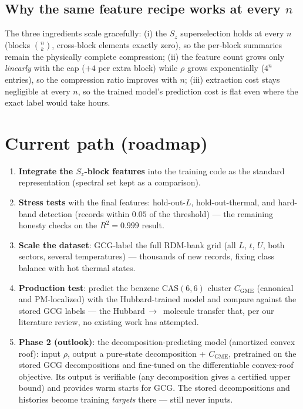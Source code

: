 \documentclass[11pt]{article}
\newcommand{\CGME}{\ensuremath{C_{\mathrm{GME}}}}
\begin{document}
\subsection{Why the same feature recipe works at every $n$}
The three ingredients scale gracefully: (i) the $S_z$ superselection holds at
every $n$ (blocks $\binom{n}{k}$, cross-block elements exactly zero), so the
per-block summaries remain the physically complete compression; (ii) the
feature count grows only \emph{linearly} with the cap ($+4$ per extra block)
while $\rho$ grows exponentially ($4^n$ entries), so the compression ratio
improves with $n$; (iii) extraction cost stays negligible at every $n$, so
the trained model's prediction cost is flat even where the exact label would
take hours.

\section{Current path (roadmap)}
\begin{enumerate}[nosep]
  \item \textbf{Integrate the $S_z$-block features} into the training code as
        the standard representation (spectral set kept as a comparison).
  \item \textbf{Stress tests} with the final features: hold-out-$L$,
        hold-out-thermal, and hard-band detection (records within $0.05$ of
        the threshold) --- the remaining honesty checks on the $R^2=0.999$
        result.
  \item \textbf{Scale the dataset}: GCG-label the full RDM-bank grid
        (all $L$, $t$, $U$, both sectors, several temperatures) --- thousands
        of new records, fixing class balance with hot thermal states.
  \item \textbf{Production test}: predict the benzene CAS$(6,6)$ cluster
        \CGME{} (canonical and PM-localized) with the Hubbard-trained model
        and compare against the stored GCG labels --- the Hubbard\,$\to$\,%
        molecule transfer that, per our literature review, no existing work
        has attempted.
  \item \textbf{Phase 2 (outlook)}: the decomposition-predicting model
        (amortized convex roof): input $\rho$, output a pure-state
        decomposition + \CGME{}, pretrained on the stored GCG decompositions
        and fine-tuned on the differentiable convex-roof objective. Its
        output is verifiable (any decomposition gives a certified upper
        bound) and provides warm starts for GCG. The stored decompositions
        and histories become training \emph{targets} there --- still never
        inputs.
\end{enumerate}
\end{document}

